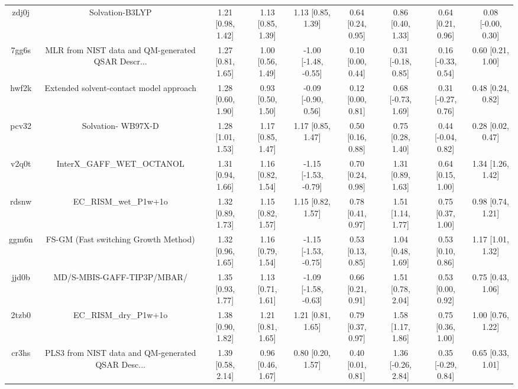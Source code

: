 \documentclass{article}
\begin{document}
\begin{center}
\begin{longtable}{|ccccccccc|}
 zdj0j &                                    Solvation-B3LYP &  1.21 [0.98, 1.42] &  1.13 [0.85, 1.39] &     1.13 [0.85, 1.39] &  0.64 [0.24, 0.95] &    0.86 [0.40, 1.33] &    0.64 [0.21, 0.96] &    0.08 [-0.00, 0.30] \\
 7gg6s &  MLR from NIST data and QM-generated QSAR Descr... &  1.27 [0.81, 1.65] &  1.00 [0.56, 1.49] &  -1.00 [-1.48, -0.55] &  0.10 [0.00, 0.44] &   0.31 [-0.18, 0.85] &   0.16 [-0.33, 0.54] &     0.60 [0.21, 1.00] \\
 hwf2k &            Extended solvent-contact model approach &  1.28 [0.60, 1.90] &  0.93 [0.50, 1.50] &   -0.09 [-0.90, 0.56] &  0.12 [0.00, 0.81] &   0.68 [-0.73, 1.69] &   0.31 [-0.27, 0.76] &     0.48 [0.24, 0.82] \\
 pcv32 &                                 Solvation- WB97X-D &  1.28 [1.01, 1.53] &  1.17 [0.85, 1.47] &     1.17 [0.85, 1.47] &  0.50 [0.16, 0.88] &    0.75 [0.28, 1.40] &   0.44 [-0.04, 0.82] &     0.28 [0.02, 0.47] \\
 v2q0t &                         InterX\_GAFF\_WET\_OCTANOL &  1.31 [0.94, 1.66] &  1.16 [0.82, 1.54] &  -1.15 [-1.53, -0.79] &  0.70 [0.24, 0.98] &    1.31 [0.89, 1.63] &    0.64 [0.15, 1.00] &     1.34 [1.26, 1.42] \\
 rdsnw &                              EC\_RISM\_wet\_P1w+1o &  1.32 [0.89, 1.73] &  1.15 [0.82, 1.57] &     1.15 [0.82, 1.57] &  0.78 [0.41, 0.97] &    1.51 [1.14, 1.77] &    0.75 [0.37, 1.00] &     0.98 [0.74, 1.21] \\
 ggm6n &               FS-GM (Fast switching Growth Method) &  1.32 [0.96, 1.65] &  1.16 [0.79, 1.54] &  -1.15 [-1.53, -0.75] &  0.53 [0.13, 0.85] &    1.04 [0.48, 1.69] &    0.53 [0.10, 0.86] &     1.17 [1.01, 1.32] \\
 jjd0b &                         MD/S-MBIS-GAFF-TIP3P/MBAR/ &  1.35 [0.93, 1.77] &  1.13 [0.71, 1.61] &  -1.09 [-1.58, -0.63] &  0.66 [0.21, 0.91] &    1.51 [0.78, 2.04] &    0.53 [0.00, 0.92] &     0.75 [0.43, 1.06] \\
 2tzb0 &                              EC\_RISM\_dry\_P1w+1o &  1.38 [0.90, 1.82] &  1.21 [0.81, 1.65] &     1.21 [0.81, 1.65] &  0.79 [0.37, 0.97] &    1.58 [1.17, 1.86] &    0.75 [0.36, 1.00] &     1.00 [0.76, 1.22] \\
 cr3hs &  PLS3 from NIST data and QM-generated QSAR Desc... &  1.39 [0.58, 2.14] &  0.96 [0.46, 1.67] &     0.80 [0.20, 1.57] &  0.40 [0.01, 0.81] &   1.36 [-0.26, 2.84] &   0.35 [-0.29, 0.84] &     0.65 [0.33, 1.01] \\

\end{longtable}
\end{center}
\end{document}
